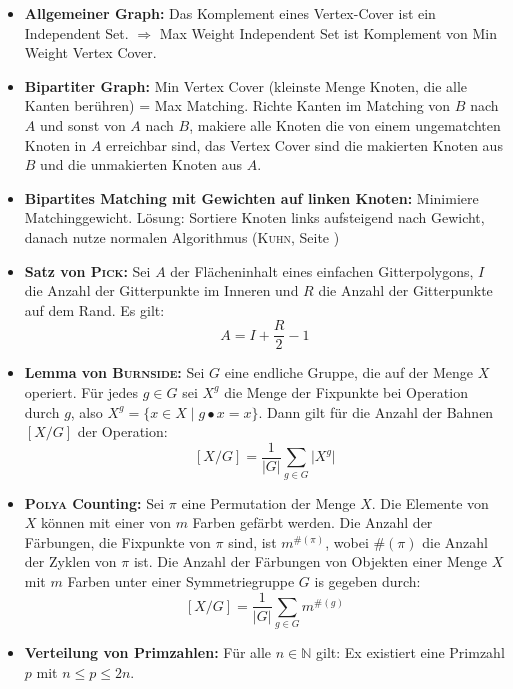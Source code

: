 \begin{itemize}
	\item \textbf{Allgemeiner Graph:}
	Das Komplement eines Vertex-Cover ist ein Independent Set.
	$\Rightarrow$ Max Weight Independent Set ist Komplement von Min Weight Vertex Cover.

	\item \textbf{Bipartiter Graph:}
	Min Vertex Cover (kleinste Menge Knoten, die alle Kanten berühren) = Max Matching.
	Richte Kanten im Matching von $B$ nach $A$ und sonst von $A$ nach $B$, makiere alle Knoten die von einem ungematchten Knoten in $A$ erreichbar sind, das Vertex Cover sind die makierten Knoten aus $B$ und die unmakierten Knoten aus $A$.

	\item \textbf{Bipartites Matching mit Gewichten auf linken Knoten:}
	Minimiere Matchinggewicht.
	Lösung: Sortiere Knoten links aufsteigend nach Gewicht, danach nutze normalen Algorithmus (\textsc{Kuhn}, Seite \pageref{kuhn})

	\item \textbf{Satz von \textsc{Pick}:}
	Sei $A$ der Flächeninhalt eines einfachen Gitterpolygons, $I$ die Anzahl der Gitterpunkte im Inneren und $R$ die Anzahl der Gitterpunkte auf dem Rand.
	Es gilt:\vspace*{-\baselineskip}
	\[
		A = I + \frac{R}{2} - 1
	\]

\columnbreak
	\item \textbf{Lemma von \textsc{Burnside}:}
	Sei $G$ eine endliche Gruppe, die auf der Menge $X$ operiert.
	Für jedes $g \in G$ sei $X^g$ die Menge der Fixpunkte bei Operation durch $g$, also $X^g = \{x \in X \mid g \bullet x = x\}$.
	Dann gilt für die Anzahl der Bahnen $[X/G]$ der Operation:
	\[
		[X/G] = \frac{1}{\vert G \vert} \sum_{g \in G} \vert X^g \vert
	\]

	\item \textbf{\textsc{Polya} Counting:}
	Sei $\pi$ eine Permutation der Menge $X$.
	Die Elemente von $X$ können mit einer von $m$ Farben gefärbt werden.
	Die Anzahl der Färbungen, die Fixpunkte von $\pi$ sind, ist $m^{\#(\pi)}$, wobei $\#(\pi)$ die Anzahl der Zyklen von $\pi$ ist.
	Die Anzahl der Färbungen von Objekten einer Menge $X$ mit $m$ Farben unter einer Symmetriegruppe $G$ is gegeben durch:
	\[
		[X/G] = \frac{1}{\vert G \vert} \sum_{g \in G} m^{\#(g)}
	\]

	\item \textbf{Verteilung von Primzahlen:}
	Für alle $n \in \mathbb{N}$ gilt: Ex existiert eine Primzahl $p$ mit $n \leq p \leq 2n$.


\end{itemize}
